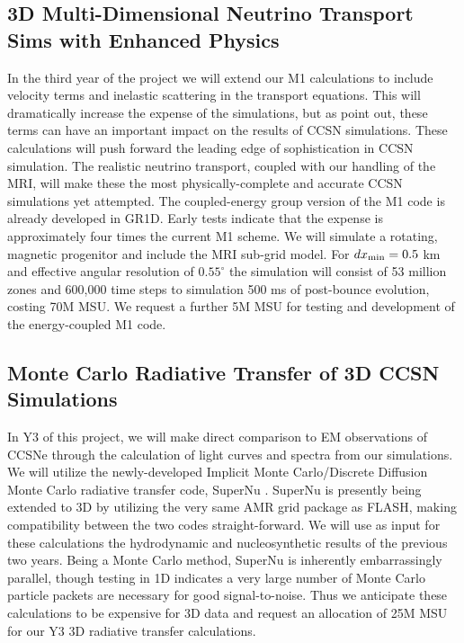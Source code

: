 \subsection{3D Multi-Dimensional Neutrino Transport Sims with Enhanced Physics}
\label{sec:enhancedM1}

In the third year of the project we will extend our M1 calculations to include velocity terms and inelastic scattering in the transport equations.
This will dramatically increase the expense of the simulations, but as \citet{Lentz:2012fy} point out, these terms can have an important impact on the results of CCSN simulations.
These calculations will push forward the leading edge of sophistication in CCSN simulation.
The realistic neutrino transport, coupled with our handling of the MRI, will make these the most physically-complete and accurate CCSN simulations yet attempted.
The coupled-energy group version of the M1 code is already developed in GR1D.
Early tests indicate that the expense is approximately four times the current M1 scheme.
We will simulate a rotating, magnetic progenitor and include the MRI sub-grid model.
For $dx_{\rm min} = 0.5$ km and effective angular resolution of $0.55^\circ$ the simulation will consist of 53 million zones and 600,000 time steps to simulation 500 ms of post-bounce evolution, costing 70M MSU.
We request a further 5M MSU for testing and development of the energy-coupled M1 code.

\subsection{Monte Carlo Radiative Transfer of 3D CCSN Simulations}
\label{sec:radtrans}


In Y3 of this project, we will make direct comparison to EM observations of CCSNe through the calculation of light curves and spectra from our simulations.
We will utilize the newly-developed Implicit Monte Carlo/Discrete Diffusion Monte Carlo radiative transfer code, SuperNu \citep{Wollaeger:2013ix}.
SuperNu is presently being extended to 3D by utilizing the very same AMR grid package as FLASH, making compatibility between the two codes straight-forward.
We will use as input for these calculations the hydrodynamic and nucleosynthetic results of the previous two years.
Being a Monte Carlo method, SuperNu is inherently embarrassingly parallel, though testing in 1D indicates a very large number of Monte Carlo particle packets are necessary for good signal-to-noise.
Thus we anticipate these calculations to be expensive for 3D data and request an allocation of 25M MSU for our Y3 3D radiative transfer calculations.


